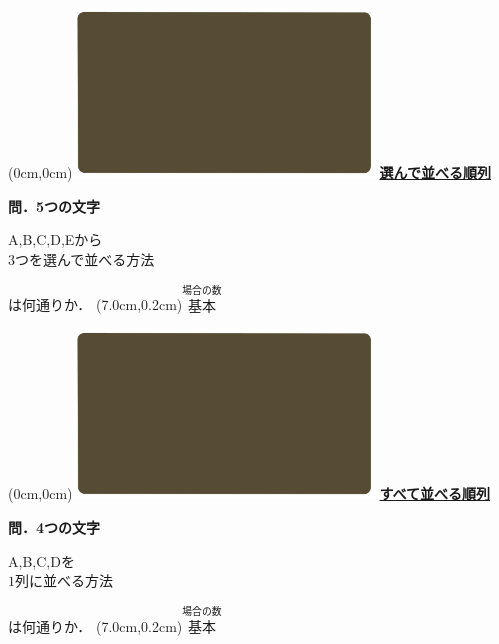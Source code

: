 \documentclass[10pt,
fleqn,
dvipdfmx,
uplatex
]{jsarticle}
\begin{document}
\newpage



\at(0cm,0cm){\includegraphics[width=8cm,bb=0 0 1920 1080]{./youtube/thumbnails/templates/smart_background/場合の数.jpeg}}
{\color{orange}\bf\boldmath\huge\underline{選んで並べる順列}}\vspace{0.3zw}

\large
\bf\boldmath 問．5つの文字

\huge
\vspace{-0.2zw}
A,\;B,\;C,\;D,\;Eから\\
\hfill $3$つを選んで並べる方法
\vspace{0.1zw}

\large
\hfill
は何通りか．
\at(7.0cm,0.2cm){\small\color{bradorange}$\overset{\text{場合の数}}{\text{基本}}$}


\newpage



\at(0cm,0cm){\includegraphics[width=8cm,bb=0 0 1920 1080]{./youtube/thumbnails/templates/smart_background/場合の数.jpeg}}
{\color{orange}\bf\boldmath\huge\underline{すべて並べる順列}}\vspace{0.3zw}

\large
\bf\boldmath 問．4つの文字

\Huge
\vspace{-0.2zw}
A,\;B,\;C,\;Dを\vspace{-0.2zw}\\
\hfill $1$列に並べる方法
\vspace{0.1zw}

\large
\hfill
は何通りか．
\at(7.0cm,0.2cm){\small\color{bradorange}$\overset{\text{場合の数}}{\text{基本}}$}
\end{document}
